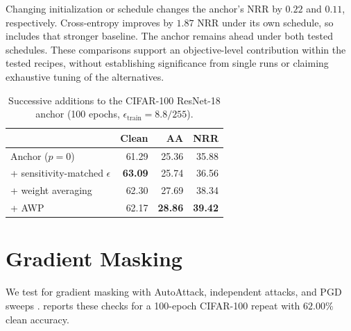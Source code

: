 Changing initialization or schedule changes the anchor's NRR by $0.22$ and $0.11$, respectively.
Cross-entropy improves by $1.87$ NRR under its own schedule, so  includes that
stronger baseline. The anchor remains ahead under both tested schedules. These comparisons support
an objective-level contribution within the tested recipes, without establishing significance from
single runs or claiming exhaustive tuning of the alternatives.

\begin{table}[!htbp]
  \centering \small \setlength{\tabcolsep}{5pt}
  \caption{Successive additions to the CIFAR-100 ResNet-18 anchor (100 epochs,
  $\epsilon_{\mathrm{train}}=8.8/255$).}
  \label{tab:ladder}
  \begin{tabular}{lrrr}
    \toprule
    & Clean & AA & NRR \\
    \midrule
    Anchor ($p=0$)                         & 61.29 & 25.36 & 35.88 \\
    \quad + sensitivity-matched $\epsilon$ & \textbf{63.09} & 25.74 & 36.56 \\
    \quad + weight averaging               & 62.30 & 27.69 & 38.34 \\
    \quad + AWP                            & 62.17 & \textbf{28.86} & \textbf{39.42} \\
    \bottomrule
  \end{tabular}
\end{table}

\section{Gradient Masking}
\label{app:gradmask}

We test for gradient masking with AutoAttack, independent attacks, and PGD sweeps
\citep{athalye2018obfuscated}.  reports these checks for a 100-epoch CIFAR-100
repeat with $62.00\%$ clean accuracy.

